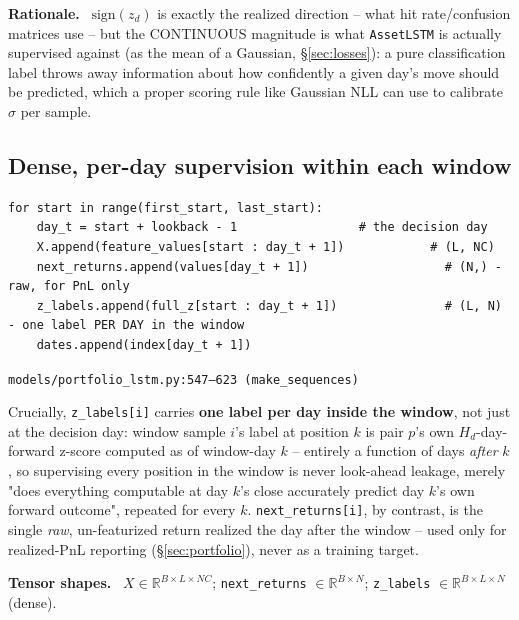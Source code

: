 \documentclass[11pt]{article}
\newcommand{\srcref}[1]{\hfill\textcolor{cmtcolor}{\footnotesize\texttt{#1}}}
\newcommand{\code}[1]{\texttt{\small #1}}
\newcommand{\rationalelabel}{\small\textbf{Rationale.}~}
\newcommand{\dimslabel}{\small\textbf{Tensor shapes.}~}
\begin{document}
\begin{rationale}\rationalelabel
$\text{sign}(z_d)$ is exactly the realized direction -- what hit rate/confusion matrices use
-- but the CONTINUOUS magnitude is what \texttt{AssetLSTM} is actually supervised against
(as the mean of a Gaussian, \S\ref{sec:losses}): a pure classification label throws away
information about how confidently a given day's move should be predicted, which a proper
scoring rule like Gaussian NLL can use to calibrate $\sigma$ per sample.
\end{rationale}

\subsection{Dense, per-day supervision within each window}

\begin{lstlisting}[caption={Sliding window construction - X, next-day returns, and DENSE per-day labels.}, label=lst:makeseq]
for start in range(first_start, last_start):
    day_t = start + lookback - 1                 # the decision day
    X.append(feature_values[start : day_t + 1])            # (L, NC)
    next_returns.append(values[day_t + 1])                   # (N,) - raw, for PnL only
    z_labels.append(full_z[start : day_t + 1])               # (L, N) - one label PER DAY in the window
    dates.append(index[day_t + 1])
\end{lstlisting}
\srcref{models/portfolio\_lstm.py:547--623 (\texttt{make\_sequences})}

Crucially, \code{z\_labels[i]} carries \textbf{one label per day inside the window}, not
just at the decision day: window sample $i$'s label at position $k$ is pair $p$'s own
$H_d$-day-forward z-score computed as of window-day $k$ -- entirely a function of days
\emph{after} $k$, so supervising every position in the window is never look-ahead leakage,
merely "does everything computable at day $k$'s close accurately predict day $k$'s own
forward outcome", repeated for every $k$. \texttt{next\_returns[i]}, by contrast, is the
single \emph{raw}, un-featurized return realized the day after the window -- used only for
realized-PnL reporting (\S\ref{sec:portfolio}), never as a training target.

\begin{dims}\dimslabel
$X \in \mathbb{R}^{B\times L\times NC}$; \code{next\_returns} $\in \mathbb{R}^{B\times N}$;
\code{z\_labels} $\in \mathbb{R}^{B \times L \times N}$ (dense).
\end{dims}
\end{document}
